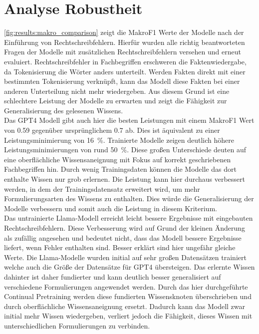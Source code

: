 \section{Analyse Robustheit}\label{sec:results:robustness}
\cref{fig:results:makro_comparison} zeigt die MakroF1 Werte der Modelle nach der Einführung von Rechtschreibfehlern.
Hierfür wurden alle richtig beantworteten Fragen der Modelle mit zusätzlichen Rechtschreibfehlern versehen und erneut evaluiert.
Rechtschreibfehler in Fachbegriffen erschweren die Faktenwiedergabe, da Tokenisierung die Wörter anders unterteilt.
Werden Fakten direkt mit einer bestimmten Tokenisierung verknüpft, kann das Modell diese Fakten bei einer anderen Unterteilung nicht mehr wiedergeben.
Aus diesem Grund ist eine schlechtere Leistung der Modelle zu erwarten und zeigt die Fähigkeit zur Generalisierung des gelesenen Wissens.\\

Das GPT4 Modell gibt auch hier die besten Leistungen mit einem MakroF1 Wert von \num{0.59} gegenüber ursprünglichem \num{0.7} ab.
Dies ist äquivalent zu einer Leistungsminimierung von \SI{16}{\percent}. Trainierte Modelle zeigen deutlich höhere Leistungsminimierungen von rund \SI{50}{\percent}.
Diese großen Unterschiede deuten auf eine oberflächliche Wissensaneignung mit Fokus auf korrekt geschriebenen Fachbegriffen hin.
Durch wenig Trainingsdaten können die Modelle das dort enthalte Wissen nur grob erlernen.
Die Leistung kann hier durchaus verbessert werden, in dem der Trainingsdatensatz erweitert wird, um mehr Formulierungsarten des Wissens zu enthalten.
Dies würde die Generalisierung der Modelle verbessern und somit auch die Leistung in diesem Kriterium.\\

Das untrainierte Llama-Modell erreicht leicht bessere Ergebnisse mit eingebauten Rechtschreibfehlern.
Diese Verbesserung wird auf Grund der kleinen Änderung als zufällig angesehen und bedeutet nicht, dass das Modell bessere Ergebnisse liefert, wenn Fehler enthalten sind.
Besser erklärt sind hier ungefähr gleiche Werte.
Die Llama-Modelle wurden initial auf sehr großen Datensätzen trainiert welche auch die Größe der Datensätze für GPT4 übersteigen.
Das erlernte Wissen dahinter ist daher fundierter und kann deutlich besser generalisiert auf verschiedene Formulierungen angewendet werden.
Durch das hier durchgeführte Continual Pretraining werden diese fundierten Wissensknoten überschrieben und durch oberflächliche Wissensaneignung ersetzt.
Dadurch kann das Modell zwar initial mehr Wissen wiedergeben, verliert jedoch die Fähigkeit, dieses Wissen mit unterschiedlichen Formulierungen zu verbinden.\\

